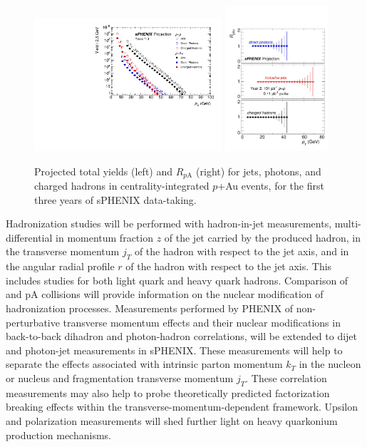 \begin{figure}[t]
\centering
\includegraphics[width=0.62\textwidth]{figs/master_Years13_pA_yields.pdf}
\includegraphics[width=0.34\textwidth]{figs/RpA.pdf}
\caption{Projected total yields (left) and $R_{p\mathrm{A}}$ (right) for jets, photons, and charged hadrons in centrality-integrated $p$+Au events, for the first three years of sPHENIX data-taking.}
\label{fig:jet_RpA_proj}
\end{figure}

Hadronization studies will be performed with hadron-in-jet measurements,
multi-differential in momentum fraction $z$ of the jet carried by the
produced hadron, in the transverse momentum $j_T$ of the hadron with
respect to the jet axis, and in the angular radial profile $r$ of the
hadron with respect to the jet axis. This includes studies for both
light quark and heavy quark hadrons. Comparison of \pp and pA
collisions will provide information on the nuclear modification of
hadronization processes. Measurements performed by PHENIX of
non-perturbative transverse momentum effects and their nuclear
modifications in back-to-back dihadron and photon-hadron correlations,
will be extended to dijet and photon-jet measurements in sPHENIX.
These measurements will help to separate the effects associated with
intrinsic parton momentum $k_T$ in the nucleon or nucleus and
fragmentation transverse momentum $j_T$. These correlation
measurements may also help to probe theoretically predicted
factorization breaking effects within the
transverse-momentum-dependent framework. Upsilon and \jpsi
polarization measurements will shed further light on heavy quarkonium
production mechanisms. 
